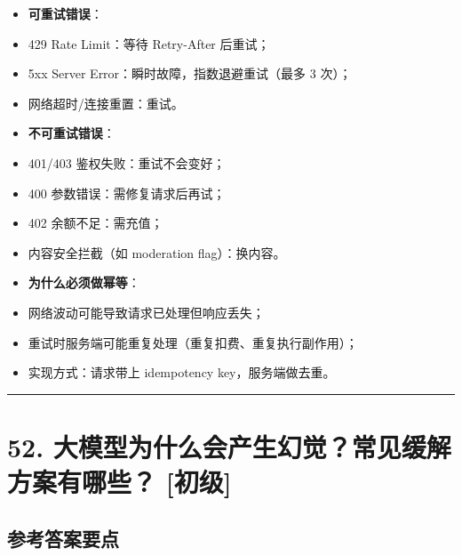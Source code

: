 \documentclass[9pt,a4paper,twocolumn]{ctexart}
\newcommand{\lvchu}{\usebox{\badgechubox}}
\def\lvchu{[初级]}%
\begin{document}
\begin{itemize}[itemsep=1pt, topsep=2pt]
  \item \textbf{可重试错误}：
  \item 429 Rate Limit：等待 Retry-After 后重试；
  \item 5xx Server Error：瞬时故障，指数退避重试（最多 3 次）；
  \item 网络超时/连接重置：重试。
  \item \textbf{不可重试错误}：
  \item 401/403 鉴权失败：重试不会变好；
  \item 400 参数错误：需修复请求后再试；
  \item 402 余额不足：需充值；
  \item 内容安全拦截（如 moderation flag）：换内容。
  \item \textbf{为什么必须做幂等}：
  \item 网络波动可能导致请求已处理但响应丢失；
  \item 重试时服务端可能重复处理（重复扣费、重复执行副作用）；
  \item 实现方式：请求带上 idempotency key，服务端做去重。
\end{itemize}


\vspace{2pt}
\noindent\rule{\columnwidth}{0.3pt}\vspace{2pt}



\section*{52. 大模型为什么会产生幻觉？常见缓解方案有哪些？ \lvchu{}}


\subsection*{参考答案要点}
\end{document}
